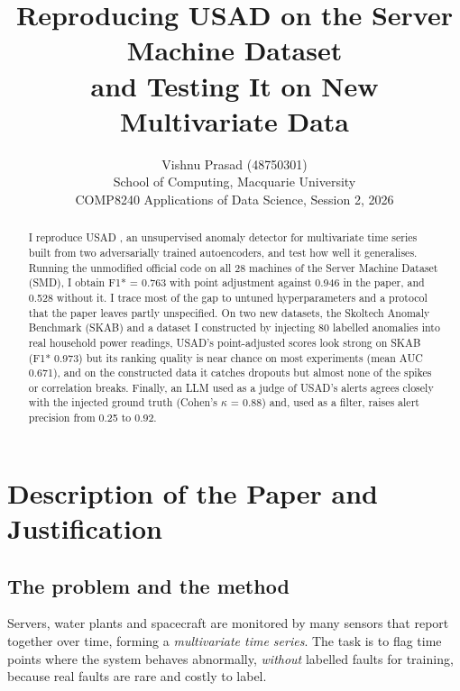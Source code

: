 \documentclass[11pt]{article}
\title{Reproducing USAD on the Server Machine Dataset\\and Testing It on New Multivariate Data}
\author{Vishnu Prasad (48750301) \\
  School of Computing, Macquarie University \\
  COMP8240 Applications of Data Science, Session 2, 2026}
\begin{document}
\maketitle

\begin{abstract}
I reproduce USAD \citep{audibert2020usad}, an unsupervised anomaly detector for multivariate time series built from two adversarially trained autoencoders, and test how well it generalises. Running the unmodified official code on all 28 machines of the Server Machine Dataset (SMD), I obtain F1* = 0.763 with point adjustment against 0.946 in the paper, and 0.528 without it. I trace most of the gap to untuned hyperparameters and a protocol that the paper leaves partly unspecified. On two new datasets, the Skoltech Anomaly Benchmark (SKAB) and a dataset I constructed by injecting 80 labelled anomalies into real household power readings, USAD's point-adjusted scores look strong on SKAB (F1* 0.973) but its ranking quality is near chance on most experiments (mean AUC 0.671), and on the constructed data it catches dropouts but almost none of the spikes or correlation breaks. Finally, an LLM used as a judge of USAD's alerts agrees closely with the injected ground truth (Cohen's $\kappa$ = 0.88) and, used as a filter, raises alert precision from 0.25 to 0.92.
\end{abstract}

\section{Description of the Paper and Justification}
\label{sec:paper}

\subsection{The problem and the method}
Servers, water plants and spacecraft are monitored by many sensors that report together over time, forming a \emph{multivariate time series}. The task is to flag time points where the system behaves abnormally, \emph{without} labelled faults for training, because real faults are rare and costly to label.
\end{document}
